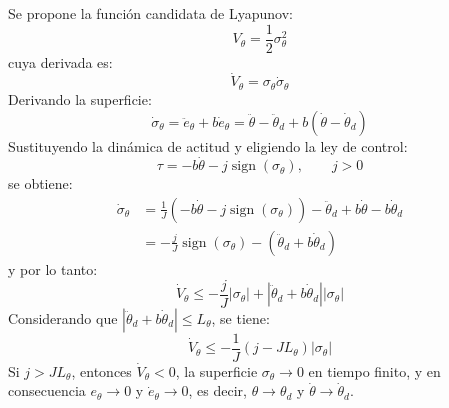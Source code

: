 \begin{enumerate}
\begin{itemize}
        Se propone la función candidata de Lyapunov:
        \begin{equation*}
            V_\theta=\frac{1}{2}\sigma_\theta^2
        \end{equation*}
        cuya derivada es:
        \begin{equation*}
            \dot{V}_\theta = \sigma_\theta\dot{\sigma}_\theta
        \end{equation*}
        Derivando la superficie:
        \begin{equation*}
            \dot{\sigma}_\theta = \ddot{e}_\theta+b\dot{e}_\theta = \ddot{\theta}-\ddot{\theta}_d+b(\dot{\theta}-\dot{\theta}_d)
        \end{equation*}
        Sustituyendo la dinámica de actitud y eligiendo la ley de control:
        \begin{equation*}
            \tau = -b\dot{\theta}-j\operatorname{sign}(\sigma_\theta),\qquad j>0
        \end{equation*}
        se obtiene:
        \begin{equation*}
            \begin{aligned}
                \dot{\sigma}_\theta &= \frac{1}{J}\left(-b\dot{\theta}-j\operatorname{sign}(\sigma_\theta)\right)-\ddot{\theta}_d+b\dot{\theta}-b\dot{\theta}_d \\
                &= -\frac{j}{J}\operatorname{sign}(\sigma_\theta)-\left(\ddot{\theta}_d+b\dot{\theta}_d\right)
            \end{aligned}
        \end{equation*}
        y por lo tanto:
        \begin{equation*}
            \dot{V}_\theta \le -\frac{j}{J}|\sigma_\theta|+\left|\ddot{\theta}_d+b\dot{\theta}_d\right||\sigma_\theta|
        \end{equation*}
        Considerando que $|\ddot{\theta}_d+b\dot{\theta}_d|\le L_\theta$, se tiene:
        \begin{equation*}
            \dot{V}_\theta \le -\frac{1}{J}\left(j-JL_\theta\right)|\sigma_\theta|
        \end{equation*}
        Si $j>J L_\theta$, entonces $\dot{V}_\theta<0$, la superficie $\sigma_\theta\to 0$ en tiempo finito, y en consecuencia $e_\theta\to 0$ y $\dot{e}_\theta\to 0$, es decir, $\theta\to\theta_d$ y $\dot{\theta}\to\dot{\theta}_d$.




















\end{itemize}
\end{enumerate}
